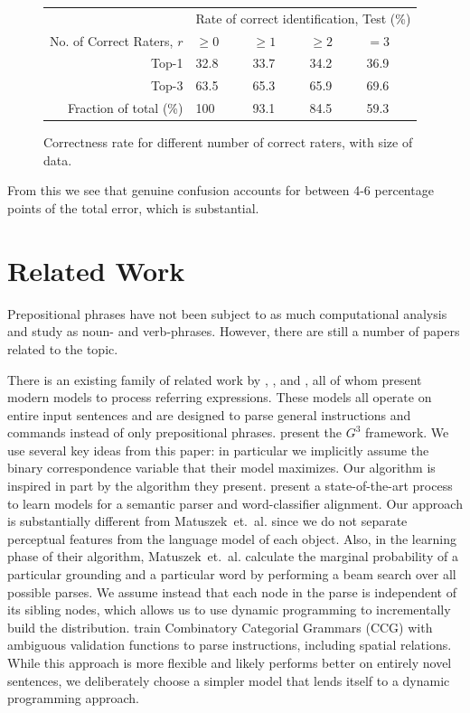 \documentclass[letterpaper,10pt]{article}
\begin{document}
\begin{figure}[h!tb]
  \centering
  \begin{tabular}{|r|m{1.2cm}m{1.2cm}m{1.2cm}m{1.2cm}|}\hline
  & \multicolumn{4}{c|}{Rate of correct identification, Test (\%)} \\
  No. of Correct Raters, $r$ & $\geq 0$ & $\geq 1$ & $\geq 2$ & $=3$ \\\hline
  Top-1 & 32.8 & 33.7 & 34.2 & 36.9 \\
  Top-3 & 63.5 & 65.3 & 65.9 & 69.6 \\\hline
  Fraction of total (\%) & 100 & 93.1 & 84.5 & 59.3 \\\hline
  \end{tabular}
  \caption{Correctness rate for different number of correct raters, with size of data.}
  \label{fig:interrater}
\end{figure}

From this we see that genuine confusion accounts for between 4-6 percentage points of the total error, which is substantial.

\section{Related Work}

Prepositional phrases have not been subject to as much computational analysis and study as noun- and verb-phrases. However, there are still a number of papers related to the topic. 

There is an existing family of related work by \citet{tellex2011understanding}, \citet{UW_RSE_ICML2012}, and \citet{artzi2013weakly}, all of whom present modern models to process referring expressions. These models all operate on entire input sentences and are designed to parse general instructions and commands instead of only prepositional phrases. 
\citet{tellex2011understanding} present the $G^3$ framework. We use several key ideas from this paper: in particular we implicitly assume the binary correspondence variable that their model maximizes. Our algorithm is inspired in part by the algorithm they present.
\citet{UW_RSE_ICML2012} present a state-of-the-art process to learn models for a semantic parser and word-classifier alignment. Our approach is substantially different from Matuszek~et.~al. since we do not separate perceptual features from the language model of each object. Also, in the learning phase of their algorithm, Matuszek~et.~al. calculate the marginal probability of a particular grounding and a particular word by performing a beam search over all possible parses. We assume instead that each node in the parse is independent of its sibling nodes, which allows us to use dynamic programming to incrementally build the distribution.
\citet{artzi2013weakly} train Combinatory Categorial Grammars (CCG) with ambiguous validation functions to parse instructions, including spatial relations. While this approach is more flexible and likely performs better on entirely novel sentences, we deliberately choose a simpler model that lends itself to a dynamic programming approach.
\end{document}
